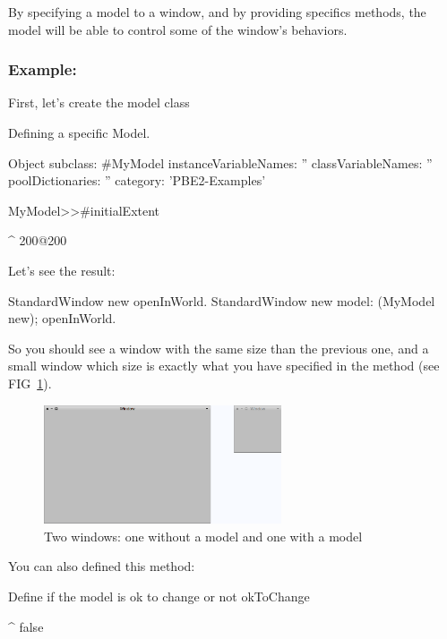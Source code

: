 \documentclass[a4paper,10pt,twoside]{book}
\begin{document}
By specifying a model to a window, and by providing specifics methods, the model will be able to control some of the window's behaviors.

\subsubsection{Example:}

First, let's create the model class

\begin{classdef}{Defining a specific Model.}

Object subclass: #MyModel
	instanceVariableNames: ''
	classVariableNames: ''
	poolDictionaries: ''
	category: 'PBE2-Examples'

MyModel>>#initialExtent

	^ 200@200
\end{classdef}

Let's see the result:

\begin{code}{}
StandardWindow new openInWorld.
StandardWindow new model: (MyModel new); openInWorld.
\end{code}

So you should see a window with the same size than the previous one, and a small window which size is exactly what you have specified in the method  (see FIG~\ref{fig:withAndWithoutModel}).

\begin{figure}[ht]\centering
	\includegraphics[width=7cm]{WithAndWithoutModel}
	\caption{Two windows: one without a model and one with a model}
	\label{fig:withAndWithoutModel}
\end{figure}

You can also defined this method:

\begin{method}{Define if the model is ok to change or not}
okToChange

	^ false
\end{method}
\end{document}
